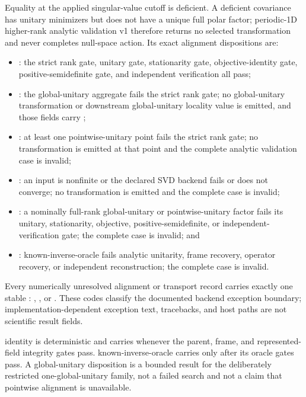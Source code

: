 \documentclass[11pt]{article}
\begin{document}
Equality at the applied singular-value cutoff is deficient. A deficient covariance has
unitary minimizers but does not have a unique full polar factor; periodic-1D higher-rank analytic validation v1 therefore returns
no selected transformation and never completes null-space action. Its exact alignment
dispositions are:

\begin{itemize}
\item {}: the strict rank gate, unitary gate, stationarity gate,
      objective-identity gate, positive-semidefinite gate, and independent verification
      all pass;
\item {}: the global-unitary aggregate fails the strict rank gate; no global-unitary
      transformation or downstream global-unitary locality value is emitted, and those fields carry
      ;
\item {}: at least one pointwise-unitary point fails the strict rank gate;
      no transformation is emitted at that point and the complete analytic validation case is invalid;
\item {}: an input is nonfinite or the declared SVD
      backend fails or does not converge; no transformation is emitted and the complete
      case is invalid;
\item {}: a nominally full-rank global-unitary or pointwise-unitary factor fails its
      unitary, stationarity, objective, positive-semidefinite, or independent-verification
      gate; the complete case is invalid; and
\item {}: known-inverse-oracle fails analytic unitarity, frame recovery,
      operator recovery, or independent reconstruction; the complete case is invalid.
\end{itemize}

Every numerically unresolved alignment or transport record carries exactly one stable
: ,
, or . These codes classify
the documented backend exception boundary; implementation-dependent exception text,
tracebacks, and host paths are not scientific result fields.

identity is deterministic and carries  whenever the parent, frame, and
represented-field integrity gates pass. known-inverse-oracle carries  only after its
oracle gates pass. A global-unitary  disposition is a bounded result
for the deliberately restricted one-global-unitary family, not a failed search and not a
claim that pointwise alignment is unavailable.
\end{document}
